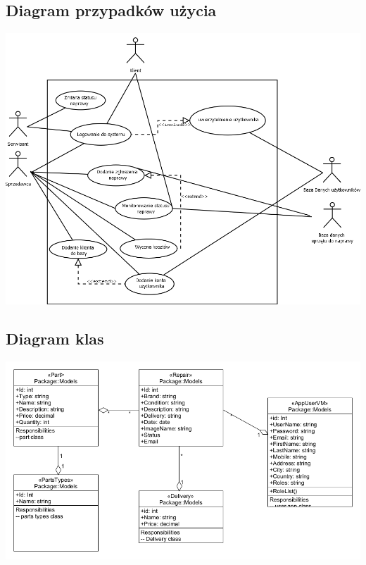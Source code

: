 \documentclass{article}
\begin{document}
\subsection{Diagram przypadków użycia}
\includegraphics[scale=0.4]{diagrams/use_case_diagram.png}
\subsection{Diagram klas}
\includegraphics[scale=0.4]{diagrams/class_diagram.png}
\end{document}
